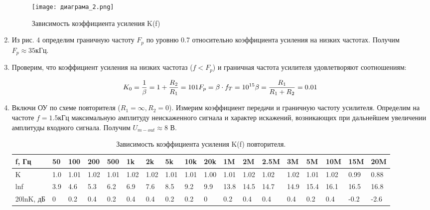 \documentclass[12pt,a4paper]{article}
\begin{document}
\begin{enumerate}
\begin{figure}[H]
    \begin{center}
        \texttt{[image: диаграма\_2.png]}
        \caption{Зависимость коэффициента усиления K(f)}
        \label{Sallen-Ki}
    \end{center}
\end{figure}

\item  Из рис. 4 определим граничную частоту $F_p$ по уровню 0.7 относительно коэффициента усиления на низких частотах. Получим $F_p \approx 35 кГц$.
\item Проверим, что коэффициент усиления на низких частотаз ($f < F_p$) и граничная частота усилителя удовлетворяют соотношениям:

\begin{equation}
   K_0 = \frac{1}{\beta} = 1 + \frac{R_2}{R_1} = 101 \\
   F_p = \beta \cdot f_T = 10^{15} \\
   \beta = \frac{R_1}{R_1 + R_2} = 0.01 
 \end{equation}

 \item Включи ОУ по схеме повторителя ($R_1 = \infty, R_2 = 0$). Измерим коэффициент передачи и граничную частоту усилителя. Определим на частоте $f = 1.5 кГц$ максимальную амплитуду неискаженного сигнала и характер искажений, возникающих при дальнейшем увеличении амплитуды входного сигнала. Получим $U_{m-out} \approx 8$ В. 


\begin{table}[H]
    \centering
    \begin{center}
    \end{center}
    \vspace{0.1cm}
    \label{tab:my_label}
    \begin{tabular}{|p{2cm}|p{1cm}|p{1cm}|p{1cm}|p{1cm}|p{1cm}|p{1cm}|p{1cm}|p{1cm}|p{1cm}|p{1cm}|p{1cm}|p{1cm}|p{1cm}|p{1cm}|p{1cm}|p{1cm}|p{1cm}|}
        \hline
        f, Гц & 50 & 100 & 200 & 500 & 1k & 2k & 5k & 10k & 20k & 1M  & 2M & 2.5M & 3M & 5M & 10M & 15M & 20M \\ 
        \hline
        K    & 1.0 & 1.01 & 1.02  & 1.01 & 1.02 & 1.02  & 1.01 & 1.01 & 1.00 & 1.01 & 1.02 & 1.02 &  1.02 & 1.01 & 1.02 & 0.99 & 0.88 \\
        \hline
        lnf     & 3.9   & 4.6  & 5.3  & 6.2 & 6.9  & 7.6 & 8.5   & 9.2  & 9.9 &  13.8 & 14.5 & 14.7 & 14.9 & 15.4 & 16.1 & 16.5 & 16.8 \\
        \hline
        20lnK, дБ   &  0  & 0.2  & 0.4 & 0.2 &  0.4  & 0.4  & 0.2 &  0.2 & 0 & 0.2 & 0.4 & 0.4 & 0.4 & 0.2 & 0.4 &-0.2& -2.6\\
        \hline 
        \end{tabular}
        \caption{Зависимость коэффициента усиления K(f) повторителя.}
\end{table}


\end{enumerate}
\end{document}
